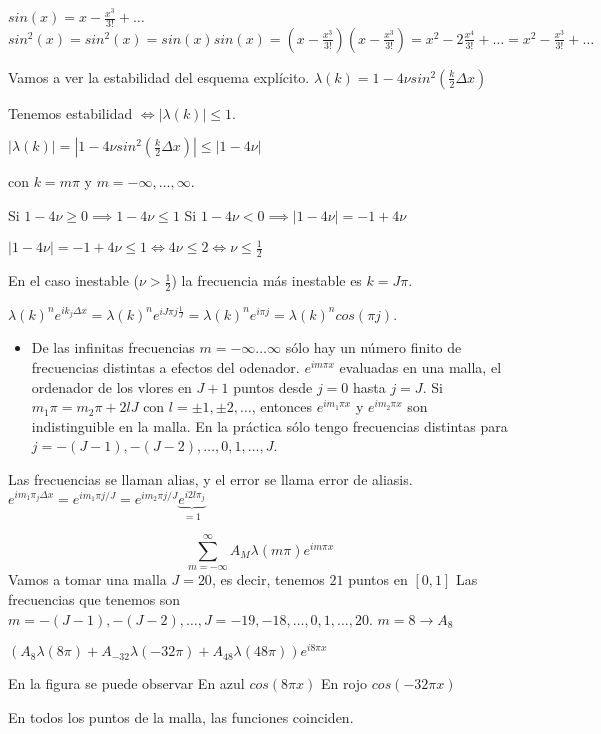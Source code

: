 $sin(x) = x-\frac{x^3}{3!}+\hdots$
$sin^2(x) = sin^2(x) = sin(x) sin(x) = (x-\frac{x^3}{3!})(x-\frac{x^3}{3!}) = x^2-2\frac{x^4}{3!} +\hdots = x^2 - \frac{x^3}{3!} + \hdots$

Vamos a ver la estabilidad del esquema explícito.
$\lambda(k) = 1-4\nu sin^2(\frac{k}{2}\Delta x)$

Tenemos estabilidad $\iff |\lambda(k)|\le 1$.

$|\lambda(k)| = |1-4\nu sin^2(\frac{k}{2}\Delta x)|\le |1-4\nu|$

con $k=m\pi$ y $m=-\infty, \hdots, \infty$.

Si $1-4\nu\ge 0 \implies 1-4\nu \le 1$
Si $1-4\nu < 0\implies |1-4\nu| = -1+4\nu$ 

$|1-4\nu| = -1+4\nu \le 1 \iff 4\nu \le 2 \iff \nu \le \frac{1}{2}$

En el caso inestable ($\nu > \frac{1}{2}$) la frecuencia más inestable es $k = J\pi$.

$\lambda(k)^n e^{ik_j\Delta x} = \lambda(k)^n e^{iJ\pi j\frac{1}{J}} = \lambda(k)^n e^{i\pi j} = \lambda(k)^n cos(\pi j)$.


\begin{itemize}
	\item De las infinitas frecuencias $m=-\infty\hdots\infty$ sólo hay un número finito de frecuencias distintas a efectos del odenador.
	$e^{im\pi x}$ evaluadas en una malla, el ordenador de los vlores en $J+1$ puntos desde $j=0$ hasta $j = J$.
	Si $m_1\pi = m_2\pi + 2lJ$ con $l=\pm1,\pm2,\hdots$, entonces $e^{im_1\pi x}$ y $e^{im_2\pi x}$ son indistinguible en la malla.
	En la práctica sólo tengo frecuencias distintas para $j=-(J-1), -(J-2), \hdots, 0, 1, \hdots, J$.
\end{itemize}

Las frecuencias se llaman alias, y el error se llama error de aliasis.
$e^{im_1\pi_j\Delta x} = 
 e^{im_1\pi j / J} = 
 e^{im_2\pi j / J}\underbrace{e^{i2l\pi_j}}_{=1}$
 
 \begin{example}
 	$$\sum_{m=-\infty}^\infty A_M\lambda(m\pi)e^{im\pi x}$$
	Vamos a tomar una malla $J=20$, es decir, tenemos $21$ puntos en $[0,1]$
	Las frecuencias que tenemos son
	$m = -(J-1), -(J-2), \hdots, J = -19, -18, \hdots, 0, 1, \hdots, 20$.
	$m = 8\to A_8$
	
	$(A_8\lambda(8\pi)+A_{-32}\lambda(-32\pi)+A_{48}\lambda(48\pi))
	e^{i8\pi x}$
	
	En la figura se puede observar
	En azul $cos(8\pi x)$
	En rojo $cos(-32\pi x)$
	
	En todos los puntos de la malla, las funciones coinciden.
 \end{example}
 
